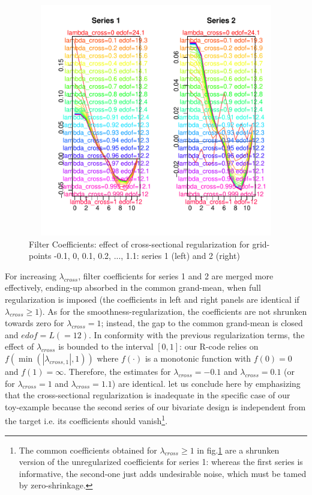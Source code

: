 \documentclass[a4paper]{book}
\begin{document}
\begin{figure}[H]\begin{center}\includegraphics[height=4in, width=6in]{z_mdfa_ms_reg_cross_1}\caption{Filter Coefficients: effect of cross-sectional regularization for grid-points -0.1, 0, 0.1, 0.2, ..., 1.1: series 1 (left) and 2 (right)\label{z_mdfa_ms_reg_cross_1}}\end{center}\end{figure}For increasing $\lambda_{cross}$, filter coefficients for series 1 and 2 are merged more effectively, ending-up absorbed in the common  grand-mean, when full regularization is imposed (the coefficients in left and right panels are identical if $\lambda_{cross}\geq 1$). As for the smoothness-regularization, the coefficients are not shrunken towards zero for $\lambda_{cross}=1$; instead, the gap to the common grand-mean is closed and $edof=L (=12)$. In conformity with the previous regularization terms, the effect of $\lambda_{cross}$ is bounded to the interval $[0,1]$: our R-code relies on $f(\min(|\lambda_{cross,1}|,1))$ where $f(\cdot)$ is a monotonic function with $f(0)=0$ and $f(1)=\infty$. Therefore, the estimates for $\lambda_{cross}=-0.1$ and $\lambda_{cross}=0.1$ (or for $\lambda_{cross}=1$ and $\lambda_{cross}=1.1$) are identical. let us conclude here by emphasizing that the cross-sectional regularization is inadequate in the specific case of our toy-example because the second series of our bivariate design is independent from the target i.e. its coefficients should vanish\footnote{The common coefficients obtained for $\lambda_{cross}\geq 1$ in fig.\ref{z_mdfa_ms_reg_cross_1} are a shrunken version of the unregularized coefficients for series 1: whereas the first series is informative, the second-one just adds undesirable noise, which must be tamed by zero-shrinkage.}. 
\end{document}
